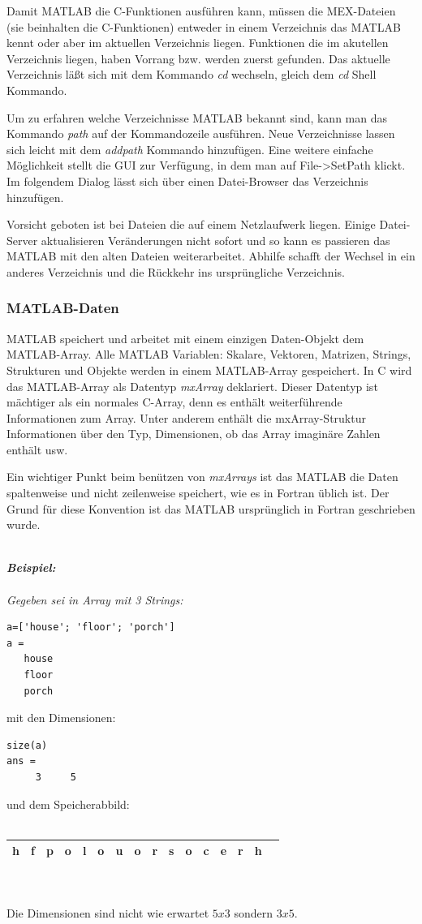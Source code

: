 \documentclass[a4paper,11pt]{article}
\begin{document}
Damit MATLAB die C-Funktionen ausführen kann, müssen die MEX-Dateien
(sie beinhalten die C-Funktionen) entweder in einem Verzeichnis das
MATLAB kennt oder aber im aktuellen Verzeichnis liegen. Funktionen die
im akutellen Verzeichnis liegen, haben Vorrang bzw. werden zuerst
gefunden. Das aktuelle Verzeichnis läßt sich mit dem Kommando \textit{cd}
wechseln, gleich dem \textit{cd} Shell Kommando.

Um zu erfahren welche Verzeichnisse MATLAB bekannt sind, kann man das
Kommando \textit{path} auf der Kommandozeile ausführen. Neue Verzeichnisse
lassen sich leicht mit dem \textit{addpath} Kommando hinzufügen. Eine
weitere einfache Möglichkeit stellt die GUI zur Verfügung, in dem man 
auf File->SetPath klickt. Im folgendem Dialog lässt sich über einen 
Datei-Browser das Verzeichnis hinzufügen. 	

Vorsicht geboten ist bei Dateien die auf einem Netzlaufwerk liegen. Einige
Datei-Server aktualisieren  Veränderungen nicht sofort und so kann es passieren
das MATLAB mit den alten Dateien weiterarbeitet. Abhilfe schafft der Wechsel
in ein anderes Verzeichnis und die Rückkehr ins ursprüngliche Verzeichnis.

\subsubsection*{MATLAB-Daten}
MATLAB speichert und arbeitet mit einem einzigen Daten-Objekt dem MATLAB-Array.
Alle MATLAB Variablen: Skalare, Vektoren, Matrizen, Strings, Strukturen und
Objekte werden in einem MATLAB-Array gespeichert. In C wird das MATLAB-Array als
Datentyp \textit{mxArray} deklariert. Dieser Datentyp ist mächtiger als ein
normales C-Array, denn es enthält weiterführende Informationen zum Array. Unter
anderem enthält die mxArray-Struktur Informationen über den Typ, Dimensionen, ob
das Array imaginäre Zahlen enthält usw.

Ein wichtiger Punkt beim benützen von \textit{mxArrays} ist das MATLAB
die Daten spaltenweise und nicht zeilenweise speichert, wie es in Fortran
üblich ist. Der Grund für diese Konvention ist das MATLAB ursprünglich in
Fortran geschrieben wurde.\\\\
{\it
\textbf{Beispiel:}\\\\
Gegeben sei in Array mit 3 Strings:
\begin{verbatim}
a=['house'; 'floor'; 'porch']
a =
   house
   floor
   porch
\end{verbatim}
mit den Dimensionen:
\begin{verbatim}
size(a)
ans =
     3     5
\end{verbatim}
und dem Speicherabbild:\\\\
\begin{tabular}{|l|l|l|l|l|l|l|l|l|l|l|l|l|l|l|l|}
\hline
h & f & p & o & l & o & u & o & r & s & o & c & e & r & h \\
\hline
\end{tabular}\\\\
Die Dimensionen sind nicht wie erwartet $5x3$ sondern $3x5$.
}
\end{document}
